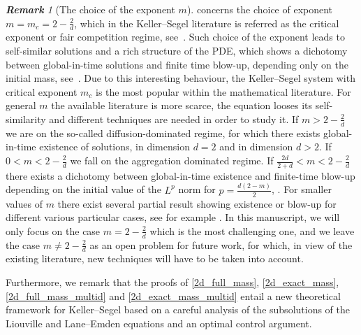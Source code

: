 \documentclass[11pt,a4paper]{article}
\numberwithin{equation}{section}
\theoremstyle{plain}
\newtheorem{conjecture}[theorem]{Conjecture}
\theoremstyle{remark}
\newtheorem{remark}[theorem]{\bf Remark}
\begin{document}
\begin{remark}
    [The choice of the exponent $m$]
     concerns the choice of exponent $m = m_c = 2 - \frac{2}{d}$, which in the Keller--Segel literature is referred as the critical exponent or fair competition regime, see~\cite{Carrillo_Craig_Yao19}. Such choice of the exponent leads to self-similar solutions and a rich structure of the PDE, which shows a dichotomy between global-in-time solutions and finite time blow-up, depending only on the initial mass, see~\cite{Blanchet_Carrillo_Laurencot09}. Due to this interesting behaviour, the Keller--Segel system with critical exponent $m_c$ is the most popular within the mathematical literature. For general $m$ the available literature is more scarce, the equation looses its self-similarity and different techniques are needed in order to study it. If $m > 2 - \frac{2}{d}$ we are on the so-called diffusion-dominated regime, for which there exists global-in-time existence of solutions, \cite{Bedrossian_Rodriguez_Bertozzi11, Bedrossian_Rodriguez14} in dimension $d = 2$ and  \cite{Calvez_Carrillo06, Sugiyama07b} in dimension $d > 2$. If $0 < m < 2 - \frac{2}{d}$ we fall on the aggregation dominated regime. If $\frac{2d}{2+d} < m < 2 - \frac{2}{d}$ there exists a dichotomy between global-in-time existence and finite-time blow-up depending on the initial value of the $L^p$ norm for $p = \frac{d (2-m)}{2}$, \cite{Chen_Liu_Wang12, Bian_Liu13, Chen_Wang14}. For smaller values of $m$ there exist several partial result showing existence or blow-up for different various particular cases, see for example \cite{Perthame04, Bedrossian11, Carrillo_FJ_Gomez-Castro24, Glogic_Schorkhuber24}. In this manuscript, we will only focus on the case $m = 2 - \frac{2}{d}$ which is the most challenging one, and we leave the case $m \neq 2 - \frac{2}{d}$ as an open problem for future work, for which, in view of the existing literature, new techniques will have to be taken into account.
    \label{rem:Different m}

Furthermore, we remark that the proofs of \ref{2d_full_mass}, \ref{2d_exact_mass}, \ref{2d_full_mass_multid} and \ref{2d_exact_mass_multid} entail a new theoretical framework for Keller--Segel based on a careful analysis of the subsolutions of the Liouville and Lane--Emden equations and an optimal control argument. 
\end{remark}


\end{document}
